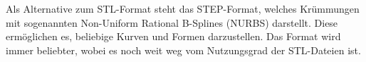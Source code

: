 \documentclass[main.tex]{subfiles}
\begin{document}
Als Alternative zum STL-Format steht das STEP-Format, welches Krümmungen mit sogenannten Non-Uniform Rational B-Splines (NURBS) darstellt.
Diese ermöglichen es, beliebige Kurven und Formen darzustellen. Das Format wird immer beliebter, wobei es noch weit weg vom Nutzungsgrad der STL-Dateien ist. \parencite{ADOBESTEP}
\end{document}
